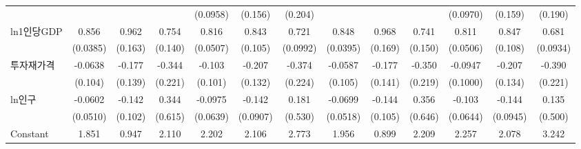 \begin{table}[htbp]
{\begin{tabular}{l*{12}{c}}
                    &                     &                     &                     &    (0.0958)         &     (0.156)         &     (0.204)         &                     &                     &                     &    (0.0970)         &     (0.159)         &     (0.190)         \\
[1em]
ln1인당GDP        &       0.856\sym{***}&       0.962\sym{***}&       0.754\sym{***}&       0.816\sym{***}&       0.843\sym{***}&       0.721\sym{***}&       0.848\sym{***}&       0.968\sym{***}&       0.741\sym{***}&       0.811\sym{***}&       0.847\sym{***}&       0.681\sym{***}\\
                    &    (0.0385)         &     (0.163)         &     (0.140)         &    (0.0507)         &     (0.105)         &    (0.0992)         &    (0.0395)         &     (0.169)         &     (0.150)         &    (0.0506)         &     (0.108)         &    (0.0934)         \\
[1em]
투자재가격        &     -0.0638         &      -0.177         &      -0.344         &      -0.103         &      -0.207         &      -0.374\sym{*}  &     -0.0587         &      -0.177         &      -0.350         &     -0.0947         &      -0.207         &      -0.390\sym{*}  \\
                    &     (0.104)         &     (0.139)         &     (0.221)         &     (0.101)         &     (0.132)         &     (0.224)         &     (0.105)         &     (0.141)         &     (0.219)         &    (0.1000)         &     (0.134)         &     (0.221)         \\
[1em]
ln인구            &     -0.0602         &      -0.142         &       0.344         &     -0.0975         &      -0.142         &       0.181         &     -0.0699         &      -0.144         &       0.356         &      -0.103         &      -0.144         &       0.135         \\
                    &    (0.0510)         &     (0.102)         &     (0.615)         &    (0.0639)         &    (0.0907)         &     (0.530)         &    (0.0518)         &     (0.105)         &     (0.646)         &    (0.0644)         &    (0.0945)         &     (0.500)         \\
[1em]
Constant            &       1.851\sym{***}&       0.947         &       2.110         &       2.202\sym{***}&       2.106\sym{**} &       2.773\sym{**} &       1.956\sym{***}&       0.899         &       2.209         &       2.257\sym{***}&       2.078\sym{**} &       3.242\sym{***}\\

\end{tabular}}
\end{table}
